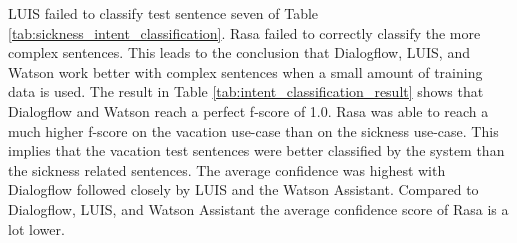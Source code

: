LUIS failed to classify test sentence seven of Table \ref{tab:sickness_intent_classification}.
Rasa failed to correctly classify the more complex sentences.
This leads to the conclusion that Dialogflow, LUIS, and Watson work better with 
complex sentences when a small amount of training data is used.
The result in Table \ref{tab:intent_classification_result} shows that 
Dialogflow and Watson reach a perfect f-score of 1.0.
Rasa was able to reach a much higher f-score on the vacation use-case than 
on the sickness use-case.
This implies that the vacation test sentences were better classified by the system than
the sickness related sentences. 
The average confidence was highest with Dialogflow followed 
closely by LUIS and the Watson Assistant.
Compared to Dialogflow, LUIS, and Watson Assistant the average confidence
score of Rasa is a lot lower.

